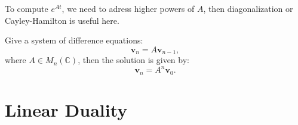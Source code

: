 \documentclass[12pt]{article}
\begin{document}
\begin{remark}
    To compute $e^{At}$, we need to adress higher powers of $A$, 
    then diagonalization or Cayley-Hamilton is useful here.
\end{remark}

\begin{exercise}
    Give a system of difference equations:
    \[ \mathbf{v}_n=A \mathbf{v}_{n-1},\]
    where $A\in M_n(\mathbb{C})$, then the solution is given by:
    \[\mathbf{v}_n=A^n \mathbf{v}_{0}.\]
\end{exercise}


\newpage
\section{Linear Duality}

\end{document}
